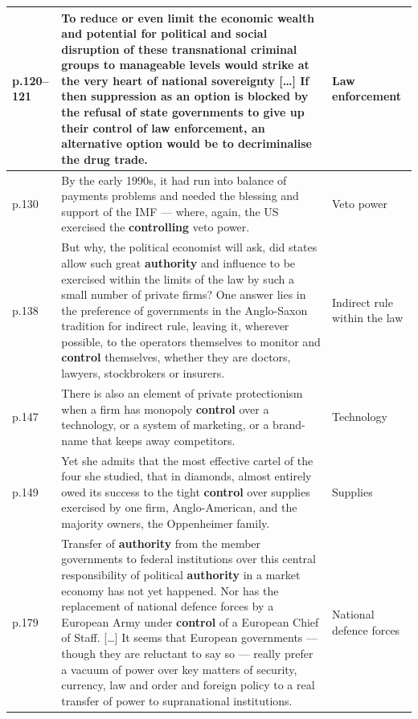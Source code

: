 \begin{longtable}{p{1.2cm} p{9.5cm} p{3.2cm}}
p.120--121 & To reduce or even limit the economic wealth and potential for political and social disruption of these transnational criminal groups to manageable levels would strike at the very heart of national sovereignty {[}\ldots{]} If then suppression as an option is blocked by the refusal of state governments to give up their \textbf{control} of law enforcement, an alternative option would be to decriminalise the drug trade. & Law enforcement \\
\midrule

p.130 & By the early 1990s, it had run into balance of payments problems and needed the blessing and support of the IMF --- where, again, the US exercised the \textbf{controlling} veto power. & Veto power \\
\midrule

p.138 & But why, the political economist will ask, did states allow such great \textbf{authority} and influence to be exercised within the limits of the law by such a small number of private firms? One answer lies in the preference of governments in the Anglo-Saxon tradition for indirect rule, leaving it, wherever possible, to the operators themselves to monitor and \textbf{control} themselves, whether they are doctors, lawyers, stockbrokers or insurers. & Indirect rule within the law \\
\midrule

p.147 & There is also an element of private protectionism when a firm has monopoly \textbf{control} over a technology, or a system of marketing, or a brand-name that keeps away competitors. & Technology \\
\midrule

p.149 & Yet she admits that the most effective cartel of the four she studied, that in diamonds, almost entirely owed its success to the tight \textbf{control} over supplies exercised by one firm, Anglo-American, and the majority owners, the Oppenheimer family. & Supplies \\
\midrule

p.179 & Transfer of \textbf{authority} from the member governments to federal institutions over this central responsibility of political \textbf{authority} in a market economy has not yet happened. Nor has the replacement of national defence forces by a European Army under \textbf{control} of a European Chief of Staff. {[}\ldots{]} It seems that European governments --- though they are reluctant to say so --- really prefer a vacuum of power over key matters of security, currency, law and order and foreign policy to a real transfer of power to supranational institutions. & National defence forces \\
\midrule


\end{longtable}
